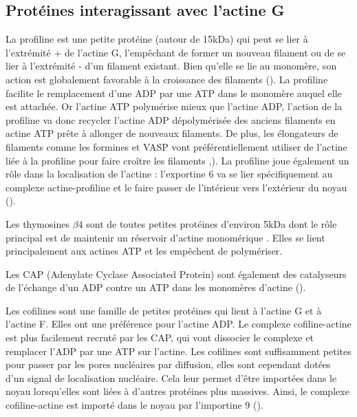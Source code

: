 \subsection{Protéines interagissant avec l'actine G}

 La profiline est une petite protéine (autour de 15kDa) qui peut se lier à l'extrémité + de l'actine G, l'empêchant de former un nouveau filament ou de se lier à l'extrémité - d'un filament existant. 
Bien qu'elle se lie au monomère, son action est globalement favorable à la croissance des filaments (\cite{pollard_quantitative_1984}). 
La profiline facilite le remplacement d'une ADP par une ATP dans le monomère auquel elle est attachée. 
Or l'actine ATP polymérise mieux que l'actine ADP, l'action de la profiline va donc recycler l'actine ADP dépolymérisée des anciens filaments en actine ATP prête à allonger de nouveaux filaments. 
De plus, les élongateurs de filaments comme les formines et VASP vont préférentiellement utiliser de l'actine liée à la profiline pour faire croître les filaments \cite{ferron_structural_2007},\cite{romero_formin_2004}). 
La profiline joue également un rôle dans la localisation de l'actine : l'exportine 6 va se lier spécifiquement au complexe actine-profiline et le faire passer de l'intérieur vers l'extérieur du noyau (\cite{dopie_active_2012}).


Les thymosines $\beta 4$ sont de toutes petites protéines d'environ 5kDa dont le rôle principal est de maintenir un réservoir d'actine monomérique \cite{safer_isolation_1990}. Elles se lient principalement aux actines ATP et les empêchent de polymériser. 

Les CAP (Adenylate Cyclase Associated Protein) sont également des catalyseurs de l'échange d'un ADP contre un ATP dans les monomères d'actine (\cite{makkonen_mammalian_2013}). 

Les cofilines sont une famille de petites protéines qui lient à l'actine G et à l'actine F. Elles ont une préférence pour l'actine ADP. 
Le complexe cofiline-actine est plus facilement recruté par les CAP, qui vont  dissocier le complexe et remplacer l'ADP par une ATP sur l'actine. 
Les cofilines sont suffisamment petites pour passer par les pores nucléaires par diffusion, elles sont cependant dotées d'un signal de localisation nucléaire. Cela leur permet d'être importées dans le noyau lorsqu'elles sont liées à d'autres protéines plus massives. 
Ainsi, le complexe cofiline-actine est importé dans le noyau par l'importine 9 (\cite{dopie_active_2012}).

